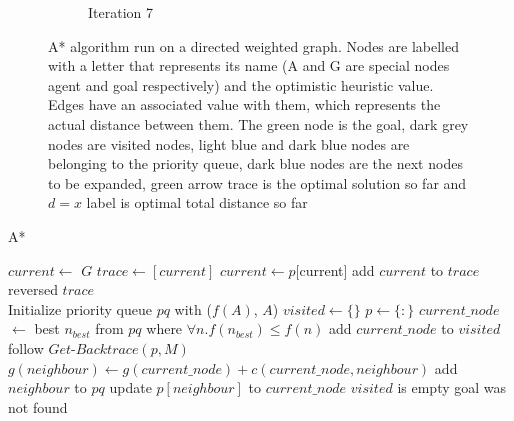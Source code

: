 \begin{figure}[h!]
\begin{subfigure}[b]{0.2\linewidth}
    \caption{Iteration 7}
  \end{subfigure}
  \caption{A* algorithm run on a directed weighted graph. Nodes are labelled with a letter that represents its name (A and G are special nodes agent and goal respectively) and the optimistic heuristic value. Edges have an associated value with them, which represents the actual distance between them. The green node is the goal, dark grey nodes are visited nodes, light blue and dark blue nodes are belonging to the priority queue, dark blue nodes are the next nodes to be expanded, green arrow trace is the optimal solution so far and $d = x$ label is optimal total distance so far}
  \label{fig:a_star_expansion}
\end{figure}

\pagebreak

\begin{algorithm}[h!]
\caption{A*}
\label{alg: a_star}
\begin{algorithmic}[1]

    \State $current \gets$ $G$
    \State $trace \gets [current]$
    \State
        \State $current \gets p[$current$]$
        \State add $current$ to $trace$
    \EndWhile
    \State
    \State \Return reversed $trace$
\EndProcedure
\\

    \State Initialize priority queue $pq$ with ($f(A)$, $A$)
    \State $visited \gets \{\}$
    \State $p \gets \{\colon\}$
    \Repeat
        \State $current\_node$ $\gets$ best $n_{best}$ from $pq$ where $\forall n.f(n_{best}) \leq f(n)$
        \State add $current\_node$ to $visited$
        \State
            \State follow $\textit{Get-Backtrace}(p, M)$
            \State \Return
        \EndIf
        \State
                \State $g(neighbour) \gets g(current\_node) + c(current\_node, neighbour)$
                \State add $neighbour$ to $pq$
                \State update $p[neighbour]$ to $current\_node$
            \EndIf
        \EndFor
    \Until $visited$ is empty
    \State
    \State goal was not found
\EndProcedure
\end{algorithmic}
\end{algorithm}

